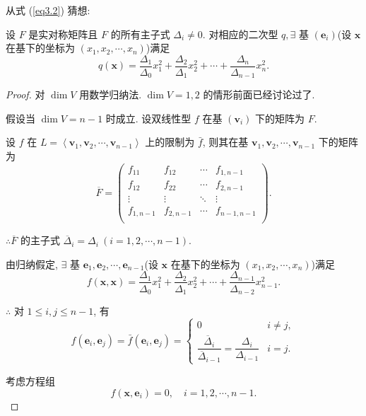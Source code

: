 \documentclass[color=black,device=normal,lang=cn,mode=geye]{elegantnote}
\begin{document}
从式 (\ref{eq3.2}) 猜想:
\begin{theorem}\label{t3.6}
    设 $F$ 是实对称矩阵且 $F$ 的所有主子式 $\Delta_i\neq0$. 对相应的二次型 $q,\exists$ 基 $(\boldsymbol{e}_i)$(设 $\boldsymbol{x}$ 在基下的坐标为 $(x_1,x_2,\cdots,x_n)$)满足
    \[q(\boldsymbol{x})=\dfrac{\Delta_1}{\Delta_0}x_1^2+\dfrac{\Delta_2}{\Delta_1}x_2^2+\cdots+\dfrac{\Delta_n}{\Delta_{n-1}}x_n^2.\]
\end{theorem}
\begin{proof}
    对 $\dim V$ 用数学归纳法. $\dim V=1,2$ 的情形前面已经讨论过了.

    假设当 $\dim V=n-1$ 时成立. 设双线性型 $f$ 在基 $(\boldsymbol{v}_i)$ 下的矩阵为 $F$.

    设 $f$ 在 $L=\left<\boldsymbol{v}_1,\boldsymbol{v}_2,\cdots,\boldsymbol{v}_{n-1}\right>$ 上的限制为 $\bar{f}$, 则其在基 $\boldsymbol{v}_1,\boldsymbol{v}_2,\cdots,\boldsymbol{v}_{n-1}$ 下的矩阵为
    \[\overline{F}=\begin{pmatrix}
        f_{11} & f_{12} & \cdots & f_{1,n-1} \\
        f_{12} & f_{22} & \cdots & f_{2,n-1} \\
        \vdots & \vdots & \ddots & \vdots \\
        f_{1,n-1} & f_{2,n-1} & \cdots & f_{n-1,n-1} \\
    \end{pmatrix}.\]

    $\therefore\overline{F}$ 的主子式 $\overline{\Delta}_i=\Delta_i\ (i=1,2,\cdots,n-1)$.

    由归纳假定, $\exists$ 基 $\boldsymbol{e}_1,\boldsymbol{e}_2,\cdots,\boldsymbol{e}_{n-1}$(设 $\boldsymbol{x}$ 在基下的坐标为 $(x_1,x_2,\cdots,x_n)$)满足
    \[f(\boldsymbol{x},\boldsymbol{x})=\dfrac{\Delta_1}{\Delta_0}x_1^2+\dfrac{\Delta_2}{\Delta_1}x_2^2+\cdots+\dfrac{\Delta_{n-1}}{\Delta_{n-2}}x_{n-1}^2.\]

    $\therefore$ 对 $1\leq i,j\leq n-1$, 有
    \[f(\boldsymbol{e}_i,\boldsymbol{e}_j)=\bar{f}(\boldsymbol{e}_i,\boldsymbol{e}_j)=\begin{cases}
        0 & i\neq j, \\
        \dfrac{\overline{\Delta}_i}{\overline{\Delta}_{i-1}}=\dfrac{\Delta_i}{\Delta_{i-1}} & i=j.
    \end{cases}\]

    考虑方程组
    \[f(\boldsymbol{x},\boldsymbol{e}_i)=0,\quad i=1,2,\cdots,n-1.\]


\end{proof}
\end{document}
